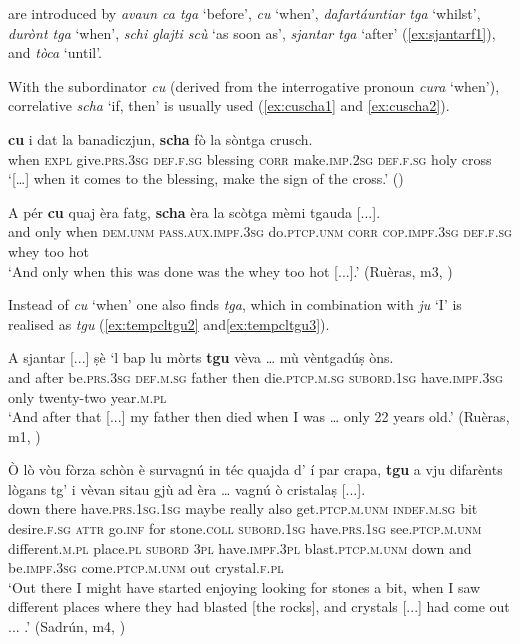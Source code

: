  are introduced by \textit{avaun ca tga} `before', \textit{cu} `when', \textit{dafartáuntiar tga} `whilst', \textit{durònt tga} `when', \textit{schi glajti scù} `as soon as', \textit{sjantar tga} `after' (\ref{ex:sjantarf1}), and \textit{tòca} `until'.

With the subordinator \textit{cu} (derived from the interrogative pronoun \textit{cura} `when'), correlative \textit{scha} `if, then' is usually used (\ref{ex:cuscha1} and \ref{ex:cuscha2}).

\ea
\label{ex:cuscha1}
\gll  […] \textbf{cu} i dat la banadiczjun, \textbf{scha} fò la sòntga crusch.\\
    {} when \textsc{expl} give.\textsc{prs.3sg} \textsc{def.f.sg} blessing \textsc{corr} make.\textsc{imp.2sg} \textsc{def.f.sg} holy cross\\
\glt `[…] when it comes to the blessing, make the sign of the cross.' (\citealt[23]{Berther2007})
\z

\ea
\label{ex:cuscha2}
	\gll  A pér \textbf{cu} quaj èra fatg, \textbf{scha} èra la scòtga mèmi tgauda [...].  \\
and only when \textsc{dem.unm} \textsc{pass.aux.impf.3sg} do.\textsc{ptcp.unm} \textsc{corr} \textsc{cop.impf.3sg} \textsc{def.f.sg} whey too hot\\
\glt `And only when this was done was the whey too hot [...].' (Ruèras, m3, )
\z

Instead of \textit{cu} `when' one also finds \textit{tga}, which in combination with \textit{ju} `I' is realised as \textit{tgu} (\ref{ex:tempcltgu2} and\ref{ex:tempcltgu3}).

\ea
\label{ex:tempcltgu2}
\gll    A sjantar [...] ṣè `l bap lu mòrts \textbf{tgu} vèva … mù vèntgadúṣ òns.\\
and after {} be.\textsc{prs.3sg} \textsc{def.m.sg} father then die.\textsc{ptcp.m.sg} \textsc{subord.1sg} have.\textsc{impf.3sg} {} only twenty-two year.\textsc{m.pl}\\
\glt `And after that [...] my father then died when I was … only 22 years old.' (Ruèras, m1, )
\z

\ea
\label{ex:tempcltgu3}
\gll  Ò lò vòu fòrza schòn è survagnú in téc quajda d' í par crapa, \textbf{tgu} a vju difarènts lògans tg’ i vèvan sitau gjù ad èra … vagnú ò cristalaṣ [...]. \\
down there  have.\textsc{prs.1sg.1sg} maybe really also get.\textsc{ptcp.m.unm} \textsc{indef.m.sg} bit desire.\textsc{f.sg} \textsc{attr} go.\textsc{inf} for stone.\textsc{coll} \textsc{subord.1sg} have.\textsc{prs.1sg} see.\textsc{ptcp.m.unm} different.\textsc{m.pl} place.\textsc{pl} \textsc{subord} \textsc{3pl} have.\textsc{impf.3pl} blast.\textsc{ptcp.m.unm} down and  be.\textsc{impf.3sg} {} come.\textsc{ptcp.m.unm} out crystal.\textsc{f.pl}\\
\glt `Out there I might have started enjoying looking for stones a bit, when I saw different places where they had blasted [the rocks], and crystals [...] had come out ... .' (Sadrún, m4, )
\z

